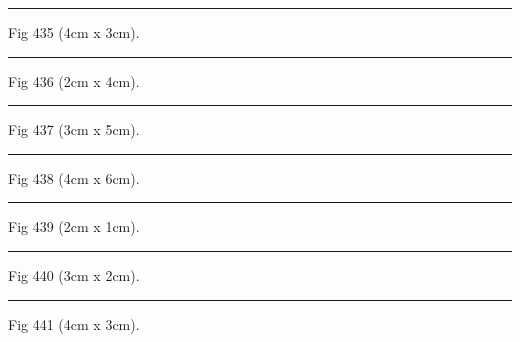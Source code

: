 \documentclass[a4paper,11pt]{article}
\begin{document}
\begin{swarmwrap}%
  \begin{minipage}[t]{4cm}
    \centering
    \rule{\linewidth}{3cm}
    {\footnotesize Fig 435 (4cm x 3cm).}
  \end{minipage}%
\end{swarmwrap}%
\swarmwrapnext
\lipsum[135]%

\begin{swarmwrap}%
  \begin{minipage}[t]{2cm}
    \centering
    \rule{\linewidth}{4cm}
    {\footnotesize Fig 436 (2cm x 4cm).}
  \end{minipage}%
\end{swarmwrap}%
\swarmwrapnext
\lipsum[136]%

\begin{swarmwrap}%
  \begin{minipage}[t]{3cm}
    \centering
    \rule{\linewidth}{5cm}
    {\footnotesize Fig 437 (3cm x 5cm).}
  \end{minipage}%
\end{swarmwrap}%
\swarmwrapnext
\lipsum[137]%

\begin{swarmwrap}%
  \begin{minipage}[t]{4cm}
    \centering
    \rule{\linewidth}{6cm}
    {\footnotesize Fig 438 (4cm x 6cm).}
  \end{minipage}%
\end{swarmwrap}%
\swarmwrapnext
\lipsum[138]%

\begin{swarmwrap}%
  \begin{minipage}[t]{2cm}
    \centering
    \rule{\linewidth}{1cm}
    {\footnotesize Fig 439 (2cm x 1cm).}
  \end{minipage}%
\end{swarmwrap}%
\swarmwrapnext
\lipsum[139]%

\begin{swarmwrap}%
  \begin{minipage}[t]{3cm}
    \centering
    \rule{\linewidth}{2cm}
    {\footnotesize Fig 440 (3cm x 2cm).}
  \end{minipage}%
\end{swarmwrap}%
\swarmwrapnext
\lipsum[140]%

\begin{swarmwrap}%
  \begin{minipage}[t]{4cm}
    \centering
    \rule{\linewidth}{3cm}
    {\footnotesize Fig 441 (4cm x 3cm).}
  \end{minipage}%
\end{swarmwrap}%
\swarmwrapnext
\lipsum[141]%
\end{document}
